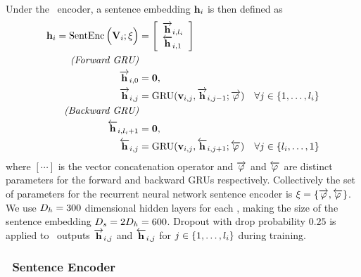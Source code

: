 Under the \recurrentneuralnetwork~encoder, a sentence embedding $\mathbf{h}_i$ is
then defined as
\begin{align} 
  \mathbf{h}_i = \operatorname{SentEnc}\Big(\mathbf{V}_i; \xi\Big) & = \left[
                \begin{array}{l}\overrightarrow{\mathbf{h}}_{i,l_i}\\ \overleftarrow{\mathbf{h}}_{i,1}
    \end{array}
  \right] \\
  \textit{(Forward GRU)} \nonumber & \\
  \overrightarrow{\mathbf{h}}_{i,0} &= \mathbf{0}, \\ 
  \overrightarrow{\mathbf{h}}_{i,j} &= 
      \operatorname{GRU}(\mathbf{v}_{i,j}, \overrightarrow{\mathbf{h}}_{i,j-1}; \overrightarrow{\varphi}) 
      & \forall j \in \{1,\ldots,l_i\} \\  
  \textit{(Backward GRU)} \nonumber & \\
  \overleftarrow{\mathbf{h}}_{i,l_i + 1} &= \mathbf{0}, \\
  \overleftarrow{\mathbf{h}}_{i,j} &= 
      \operatorname{GRU}(\mathbf{v}_{i,j},\overleftarrow{\mathbf{h}}_{i,j+1}; \overleftarrow{\varphi})
      & \forall j \in \{l_i, \ldots, 1\} 
\end{align}
where $[\cdots]$ is the vector concatenation operator and $\overrightarrow{\varphi}$ and
$\overleftarrow{\varphi}$ are distinct parameters for the forward and backward GRUs
respectively.  Collectively the set of parameters for the recurrent neural
network sentence encoder is $\xi = \left\{ \overrightarrow{\varphi},
\overleftarrow{\varphi} \right\}$. We use $D_{h}=300$ dimensional hidden layers for
each \gru, making the size of the sentence embedding $D_{s}=2D_{h}=600$.
Dropout with drop probability $0.25$ is applied to \gru~outputs
$\overrightarrow{\mathbf{h}}_{i,j}$ and $\overleftarrow{\mathbf{h}}_{i,j}$ for $j \in \{1,\ldots,l_i\}$
during training.

\subsubsection{\ConvolutionalNeuralNetwork~Sentence Encoder} 
\label{sec:sentconvenc}

